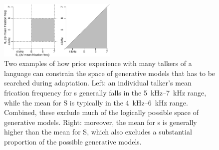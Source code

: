 \begin{figure}[htb]
  \centering
  \includegraphics[width=0.5\textwidth]{part2-schematics/range-constraints-apart.pdf}
  \caption{Two examples of how prior experience with many talkers of a language can constrain the space of generative models that has to be searched during adaptation.  Left: an individual talker's mean frication frequency for \ph s generally falls in the \SIrange{5}{7}{\kilo\hertz} range, while the mean for \ph S is typically in the \SIrange{4}{6}{\kilo\hertz} range.  Combined, these exclude much of the logically possible space of generative models.  Right: moreover, the mean for \ph s is generally higher than the mean for \ph S, which also excludes a substantial proportion of the possible generative models.}
  \label{fig:range-order-constraints}
\end{figure}

